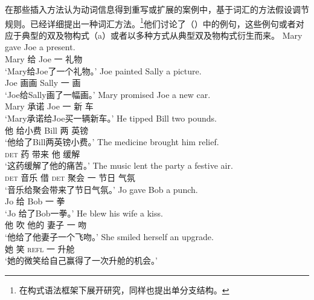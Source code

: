     在那些插入方法认为动词信息得到重写或扩展的案例中，基于词汇的方法假设调节规则。\citet[\S~4]{BC99a}已经详细提出一种词汇方法。\footnote{\citet{Kay2005a}在构式语法框架下展开研究，同样也提出单分支结构。}他们讨论了（）中的例句，这些例句或者对应于典型的双及物构式（a）或者以多种方式从典型双及物构式衍生而来。
\eal
\ex 
\gll Mary gave Joe a present.\\
Mary 给 Joe 一 礼物\\
\glt `Mary给Joe了一个礼物。'  
\ex\label{paint} 
\gll Joe painted Sally a picture.\\
Joe 画画 Sally 一 画\\
\glt `Joe给Sally画了一幅画。'  
\ex 
\gll Mary promised Joe a new car.\\
Mary 承诺 Joe 一 新 车\\
\glt `Mary承诺给Joe买一辆新车。'  
\ex 
\gll He tipped Bill two pounds.\\
他 给小费 Bill 两 英镑\\
\glt `他给了Bill两英镑小费。'  
\ex 
\gll The medicine brought him relief.\\
\textsc{det} 药 带来 他 缓解\\
\glt `这药缓解了他的痛苦。'  
\ex 
\gll The music lent the party a festive air.\\
\textsc{det} 音乐 借 \textsc{det} 聚会 一 节日 气氛\\
\glt `音乐给聚会带来了节日气氛。'  
\ex 
\gll Jo gave Bob a punch.\\
Jo 给 Bob 一 拳\\
\glt `Jo 给了Bob一拳。'  
\ex 
\gll He blew his wife a kiss.\\
他 吹 他的 妻子 一 吻\\
\glt `他给了他妻子一个飞吻。'  
\ex\label{ex-smiled-herself-an-upgrade} 
\gll She smiled herself an upgrade.\\
她 笑  \textsc{refl} 一 升舱\\
\glt `她的微笑给自己赢得了一次升舱的机会。'  
